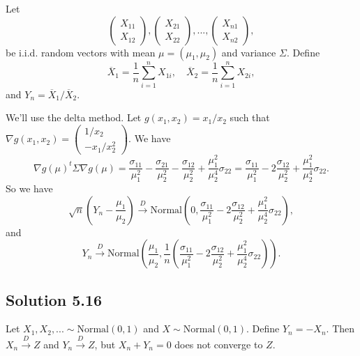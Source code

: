 Let
\begin{equation*}
    \left( \begin{array}{cc} X_{11} \\ X_{12} \end{array} \right),
    \left( \begin{array}{cc} X_{21} \\ X_{22} \end{array} \right),
    ...,
    \left( \begin{array}{cc} X_{n1} \\ X_{n2} \end{array} \right),
\end{equation*}
be i.i.d. random vectors with mean $\mu = (\mu_1, \mu_2)$ and variance $\Sigma$.
Define
\begin{equation*}
    \overline{X}_1 = \frac{1}{n} \sum_{i = 1}^n X_{1i}, \quad
    \overline{X}_2 = \frac{1}{n} \sum_{i = 1}^n X_{2i},
\end{equation*}
and $Y_n = \overline{X}_1 / \overline{X}_2$.

We'll use the delta method.
Let $g(x_1, x_2) = x_1 / x_2$ such that $\nabla g(x_1, x_2) = \left( \begin{array}{cc} 1 / x_2 \\ -x_1 / x_2^2 \end{array} \right)$.
We have
\begin{equation*}
    \nabla g(\mu)^t \Sigma \nabla g(\mu)
        = \frac{\sigma_{11}}{\mu_1^2} - \frac{\sigma_{21}}{\mu_2^2} - \frac{\sigma_{12}}{\mu_2^2} + \frac{\mu_1^2}{\mu_2^4} \sigma_{22}
        = \frac{\sigma_{11}}{\mu_1^2} - 2 \frac{\sigma_{12}}{\mu_2^2} + \frac{\mu_1^2}{\mu_2^4} \sigma_{22}.
\end{equation*}
So we have
\begin{equation*}
    \sqrt{n}\left(Y_n - \frac{\mu_1}{\mu_2}\right)
        \xrightarrow{D} \mathrm{Normal}\left(
            0,
            \frac{\sigma_{11}}{\mu_1^2} - 2 \frac{\sigma_{12}}{\mu_2^2} + \frac{\mu_1^2}{\mu_2^4} \sigma_{22}
        \right),
\end{equation*}
and
\begin{equation*}
    Y_n \xrightarrow{D} \mathrm{Normal}\left(
        \frac{\mu_1}{\mu_2},
        \frac{1}{n} \left(\frac{\sigma_{11}}{\mu_1^2} - 2 \frac{\sigma_{12}}{\mu_2^2} + \frac{\mu_1^2}{\mu_2^4} \sigma_{22}\right)
    \right).
\end{equation*}


\subsection*{Solution 5.16}

Let $X_1, X_2, ... \sim \mathrm{Normal}(0, 1)$ and $X \sim \mathrm{Normal}(0, 1)$.
Define $Y_n = -X_n$.
Then $X_n \xrightarrow{D} Z$ and $Y_n \xrightarrow{D} Z$, but $X_n + Y_n = 0$ does not converge to $Z$.
